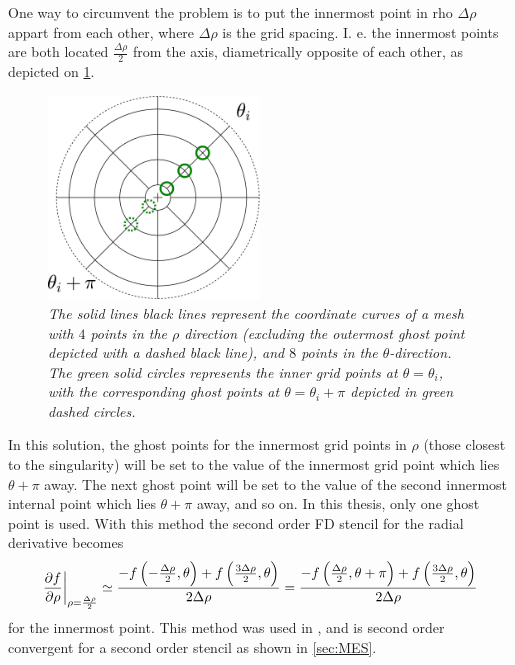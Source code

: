 One way to circumvent the problem is to put the innermost point in rho $\Delta \rho$ appart from each other, where $\Delta \rho$ is the grid spacing.
I. e. the innermost points are both located $\frac{\Delta \rho}{2}$ from the axis, diametrically opposite of each other, as depicted on \cref{fig:innerRho}.
%
\begin{figure}[htb]
    \centering
    \includegraphics[width=0.5\textwidth]{fig/innerGhost}
    \caption{\textit{
The solid lines black lines represent the coordinate curves of a mesh with $4$ points in the $\rho$ direction (excluding the outermost ghost point depicted with a dashed black line), and $8$ points in the $\theta$-direction.
The green solid circles represents the inner grid points at $\theta=\theta_i$, with the corresponding ghost points at $\theta=\theta_i + \pi$ depicted in green dashed circles.
    }}
    \label{fig:innerRho}
\end{figure}
%
In this solution, the ghost points for the innermost grid points in $\rho$ (those closest to the singularity) will be set to the value of the innermost grid point which lies $\theta + \pi$ away.
The next ghost point will be set to the value of the second innermost internal point which lies $\theta + \pi$ away, and so on.
In this thesis, only one ghost point is used.
With this method the second order FD stencil for the radial derivative becomes
%
\begin{align*}
    \left.\frac{\partial {f}}{\partial{\rho}}\right|_{\rho=\frac{\Delta \rho}{2}} \simeq
    \frac{-f\left(-\frac{\Delta \rho}{2}, \theta\right) + f\left(\frac{3\Delta \rho}{2}, \theta\right)}{2\Delta \rho}
    =
    \frac{-f\left(\frac{\Delta \rho}{2}, \theta+\pi\right) + f\left(\frac{3\Delta \rho}{2}, \theta\right)}{2\Delta \rho}
\end{align*}
%
for the innermost point.
This method was used in \cite{Naulin2008}, and is second order convergent for a second order stencil as shown in \cref{sec:MES}.

